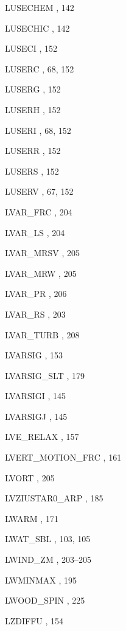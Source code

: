 \begin{theindex}
  \item LUSECHEM
    \subitem {},  142
  \item LUSECHIC
    \subitem {},  142
  \item LUSECI
    \subitem {},  152
  \item LUSERC
    \subitem {},  68, 152
  \item LUSERG
    \subitem {},  152
  \item LUSERH
    \subitem {},  152
  \item LUSERI
    \subitem {},  68, 152
  \item LUSERR
    \subitem {},  152
  \item LUSERS
    \subitem {},  152
  \item LUSERV
    \subitem {},  67, 152
  \item LVAR\_FRC
    \subitem {},  204
  \item LVAR\_LS
    \subitem {},  204
  \item LVAR\_MRSV
    \subitem {},  205
  \item LVAR\_MRW
    \subitem {},  205
  \item LVAR\_PR
    \subitem {},  206
  \item LVAR\_RS
    \subitem {},  203
  \item LVAR\_TURB
    \subitem {},  208
  \item LVARSIG
    \subitem {},  153
  \item LVARSIG\_SLT
    \subitem {},  179
  \item LVARSIGI
    \subitem {},  145
  \item LVARSIGJ
    \subitem {},  145
  \item LVE\_RELAX
    \subitem {},  157
  \item LVERT\_MOTION\_FRC
    \subitem {},  161
  \item LVORT
    \subitem {},  205
  \item LVZIUSTAR0\_ARP
    \subitem {},  185
  \item LWARM
    \subitem {},  171
  \item LWAT\_SBL
    \subitem {},  103, 105
  \item LWIND\_ZM
    \subitem {},  203--205
  \item LWMINMAX
    \subitem {},  195
  \item LWOOD\_SPIN
    \subitem {},  225
  \item LZDIFFU
    \subitem {},  154


\end{theindex}
